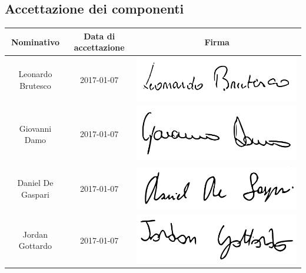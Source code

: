 \subsection{Accettazione dei componenti}
\begin{table}[H]
		\begin{center}
		\begin{tabular}{ccc}
			\toprule
			\textbf{Nominativo} & \textbf{Data di accettazione} & \textbf{Firma} \\
			\midrule
			Leonardo Brutesco	&	2017-01-07	& \includegraphics[scale=0.09]{./img/Firme/leonardo.png} \\
			\midrule
			Giovanni Damo 		&	2017-01-07	& \includegraphics[scale=0.09]{./img/Firme/giovannid.png} \\
			\midrule
			Daniel De Gaspari 	&	2017-01-07	& \includegraphics[scale=0.09]{./img/Firme/daniel.png} \\
			\midrule
			Jordan Gottardo 	&	2017-01-07	& \includegraphics[scale=0.09]{./img/Firme/jordan.png} \\

\end{tabular}
\end{center}
\end{table}
